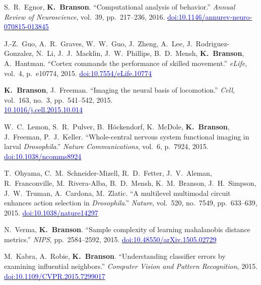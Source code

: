 \begin{cvenum}
\item S.~R.~Egnor, {\bf K.~Branson}. ``Computational analysis of behavior.'' {\em Annual Review of Neuroscience}, vol.~39, pp.~217--236, 2016. \href{https://doi.org/10.1146/annurev-neuro-070815-013845}{\small\textcolor{blue}{doi:10.1146/annurev-neuro-070815-013845}}

\item J.-Z.~Guo, A.~R.~Graves, W.~W.~Guo, J.~Zheng, A.~Lee, J.~Rodriguez-Gonzalez, N.~Li, J.~J.~Macklin, J.~W.~Phillips, B.~D.~Mensh, {\bf K.~Branson}, A.~Hantman. ``Cortex commands the performance of skilled movement.'' {\em eLife}, vol.~4, p.~e10774, 2015. \href{https://doi.org/10.7554/eLife.10774}{\small\textcolor{blue}{doi:10.7554/eLife.10774}}

\item {\bf K.~Branson}, J.~Freeman. ``Imaging the neural basis of locomotion.'' {\em Cell}, vol.~163, no.~3, pp.~541--542, 2015.\\\href{https://doi.org/10.1016/j.cell.2015.10.014}{\small\textcolor{blue}{10.1016/j.cell.2015.10.014}}

\item W.~C.~Lemon, S.~R.~Pulver, B.~H{\"o}ckendorf, K.~McDole, {\bf K.~Branson}, J.~Freeman, P.~J.~Keller. ``Whole-central nervous system functional imaging in larval {\em {D}rosophila}.'' {\em Nature Communications}, vol.~6, p.~7924, 2015.\\\href{https://doi.org/10.1038/ncomms8924}{\small\textcolor{blue}{doi:10.1038/ncomms8924}}

\item T.~Ohyama, C.~M.~Schneider-Mizell, R.~D.~Fetter, J.~V.~Aleman, R.~Franconville, M.~Rivera-Alba, B.~D.~Mensh, K.~M.~Branson, J.~H.~Simpson, J.~W.~Truman, A.~Cardona, M.~Zlatic. ``A multilevel multimodal circuit enhances action selection in {\em {D}rosophila}.'' {\em Nature}, vol.~520, no.~7549, pp.~633--639, 2015. \href{https://doi.org/10.1038/nature14297}{\small\textcolor{blue}{doi:10.1038/nature14297}}

\item N.~Verma, {\bf K.~Branson}. ``Sample complexity of learning mahalanobis distance metrics.'' {\em NIPS}, pp.~2584--2592, 2015. \href{https://proceedings.neurips.cc/paper/2015/hash/81c8727c62e800be708dbf37c4695dff-Abstract.html}{\small\textcolor{blue}{doi:10.48550/arXiv.1505.02729}}

\item M.~Kabra, A.~Robie, {\bf K.~Branson}. ``Understanding classifier errors by examining influential neighbors.'' {\em Computer Vision and Pattern Recognition}, 2015. \href{https://openaccess.thecvf.com/content_cvpr_2015/papers/Kabra_Understanding_Classifier_Errors_2015_CVPR_paper.pdf}{\small\textcolor{blue}{doi:10.1109/CVPR.2015.7299017}}


\end{cvenum}
